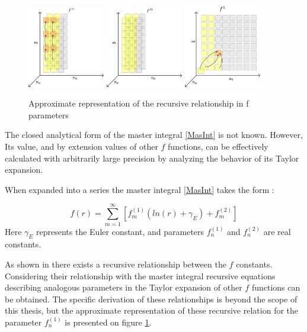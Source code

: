 \documentclass{pracalicmgr}
\begin{document}
\begin{figure}[H]
    \includegraphics[width=0.30\textwidth]{ocho.pdf}
    \includegraphics[width=0.30\textwidth]{nueve.pdf}
    \includegraphics[width=0.30\textwidth]{Picture1.pdf}
    \caption{Approximate representation of the recursive relationship in f parameters}
    \label{recu}
\end{figure}

The closed analytical form of the master integral \ref{MasInt} is not known. However, Its value, and by extension values of other $f$ functions, can be effectively calculated with arbitrarily large precision by analyzing the behavior of its Taylor expansion.

When expanded into a series the master integral \ref{MasInt} takes the form \cite{metoda}:

\begin{equation}
    f\left(r\right) = \sum_{m=1}^{\infty}{\left[f_{m}^{(1)}\left(ln\left(r\right)+\gamma_E\right)+f_{m}^{(2)}\right]}
    \label{taylor}
\end{equation}
Here $\gamma_E$ represents the Euler constant, and parameters $f_{n}^{(1)}$ and $f_{n}^{(2)}$ are real constants. 

As shown in \cite{metoda} there exists a recursive relationship between the $f$ constants. Considering their relationship with the master integral recursive equations describing analogous parameters in the Taylor expansion of other $f$ functions can be obtained. The specific derivation of these relationships is beyond the scope of this thesis, but the approximate representation of these recursive relation for the parameter $f_{n}^{(1)}$ is presented on figure \ref{recu}.  
\end{document}
